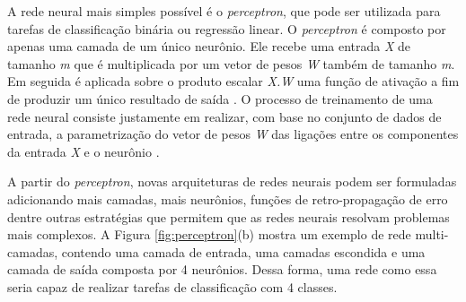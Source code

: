 A rede neural mais simples possível é o \textit{perceptron}, que pode ser utilizada para tarefas de classificação binária ou regressão linear. O \textit{perceptron} é composto por apenas uma camada de um único neurônio. Ele recebe uma entrada \textit{X} de tamanho \textit{m} que é multiplicada por um vetor de pesos \textit{W} também de tamanho \textit{m}. Em seguida é aplicada sobre o produto escalar \textit{X.W} uma função de ativação a fim de produzir um único resultado de saída \cite{block1962perceptron}. O processo de treinamento de uma rede neural consiste justamente em realizar, com base no conjunto de dados de entrada, a parametrização do vetor de pesos \textit{W} das ligações entre os componentes da entrada \textit{X} e o neurônio \cite{mueller2019deep}.


A partir do \textit{perceptron}, novas arquiteturas de redes neurais podem ser formuladas adicionando mais camadas, mais neurônios, funções de retro-propagação de erro dentre outras estratégias que permitem que as redes neurais resolvam problemas mais complexos. A Figura \ref{fig:perceptron}(b) mostra um exemplo de rede multi-camadas, contendo uma camada de entrada, uma camadas escondida e uma camada de saída composta por 4 neurônios. Dessa forma, uma rede como essa seria capaz de realizar tarefas de classificação com 4 classes.


  
